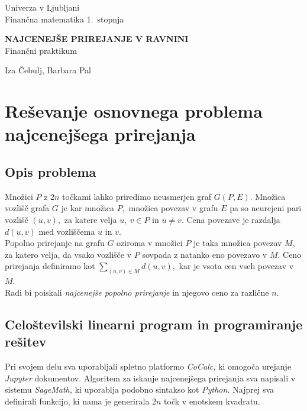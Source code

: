 \documentclass[a4paper, 11pt]{article}
\newcommand{\program}{Finančna matematika 1.~stopnja} %
\newcommand{\imeavtorja}{Iza Čebulj, Barbara Pal} %
\newcommand{\naslovdela}{Najcenejše prirejanje v ravnini}
\newcommand{\letnica}{2022}
\newcommand{\predmet}{Finančni praktikum}
\begin{document}
\thispagestyle{empty}
\begin{center}
\begin{minipage}{0.75\linewidth}
    \centering
    {\Large Univerza v Ljubljani \\ \program}
    \\
    \vspace{3cm}

    {\uppercase{\Large \textbf{\naslovdela}}} \\ \predmet\\
    \vspace{3cm}

    {\Large \imeavtorja\par}
    \vspace{9cm}

\end{minipage}
\end{center}

\noindent{\large
Ljubljana, \letnica}
\pagebreak

\thispagestyle{empty}
\tableofcontents
\pagebreak

\section{Reševanje osnovnega problema najcenejšega prirejanja}
\subsection{Opis problema}
Množici $P$ z $2n$ točkami lahko priredimo neusmerjen graf $G(P,E).$
Množica vozlišč grafa $G$ je kar množica $P,$ množica povezav v grafu $E$ pa so neurejeni pari vozlišč $(u,v),$ za katere velja $u,~v \in P$ in $u \neq v.$ 
Cena povezave je razdalja $d(u,v)$ med vozliščema $u$ in $v.$ \\
Popolno prirejanje na grafu $G$ oziroma v množici $P$ je taka množica povezav $M,$ za katero velja, da vsako vozlišče v $P$ sovpada z natanko eno povezavo v $M$.
Ceno prirejanja definiramo kot $\sum_{(u,v) \in M} d(u,v),$ kar je vsota cen vseh povezav v $M.$ \\
Radi bi poiskali \emph{najcenejše popolno prirejanje} in njegovo ceno za različne $n.$

\subsection{Celoštevilski linearni program in programiranje rešitev}
Pri svojem delu sva uporabljali spletno platformo \emph{CoCalc,} ki omogoča urejanje \emph{Jupyter} dokumentov.
Algoritem za iskanje najcenejšega prirejanja sva napisali v sistemu \emph{SageMath,} ki uporablja podobno sintakso kot \emph{Python.}
Najprej sva definirali funkcijo, ki nama je generirala $2n$ točk v enotskem kvadratu.
\end{document}
